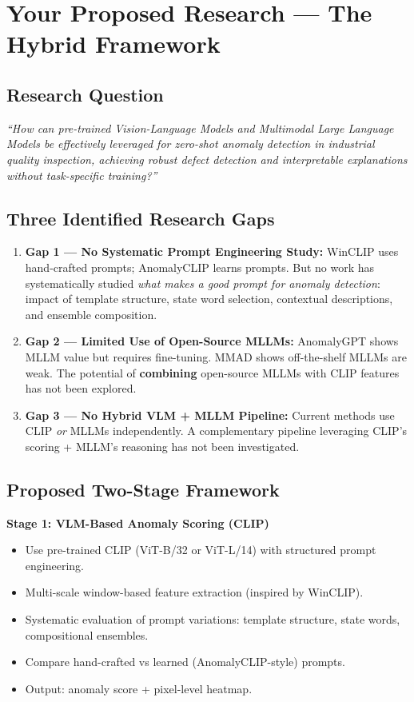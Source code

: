 \documentclass[12pt, a4paper]{article}
\begin{document}
\section{Your Proposed Research --- The Hybrid Framework}

\subsection{Research Question}
\textit{``How can pre-trained Vision-Language Models and Multimodal Large Language Models be effectively leveraged for zero-shot anomaly detection in industrial quality inspection, achieving robust defect detection and interpretable explanations without task-specific training?''}

\subsection{Three Identified Research Gaps}

\begin{enumerate}[leftmargin=*]
    \item \textbf{Gap 1 --- No Systematic Prompt Engineering Study:} WinCLIP uses hand-crafted prompts; AnomalyCLIP learns prompts. But no work has systematically studied \textit{what makes a good prompt for anomaly detection}: impact of template structure, state word selection, contextual descriptions, and ensemble composition.

    \item \textbf{Gap 2 --- Limited Use of Open-Source MLLMs:} AnomalyGPT shows MLLM value but requires fine-tuning. MMAD shows off-the-shelf MLLMs are weak. The potential of \textbf{combining} open-source MLLMs with CLIP features has not been explored.

    \item \textbf{Gap 3 --- No Hybrid VLM + MLLM Pipeline:} Current methods use CLIP \textit{or} MLLMs independently. A complementary pipeline leveraging CLIP's scoring + MLLM's reasoning has not been investigated.
\end{enumerate}

\subsection{Proposed Two-Stage Framework}

\textbf{Stage 1: VLM-Based Anomaly Scoring (CLIP)}
\begin{itemize}[leftmargin=*]
    \item Use pre-trained CLIP (ViT-B/32 or ViT-L/14) with structured prompt engineering.
    \item Multi-scale window-based feature extraction (inspired by WinCLIP).
    \item Systematic evaluation of prompt variations: template structure, state words, compositional ensembles.
    \item Compare hand-crafted vs learned (AnomalyCLIP-style) prompts.
    \item Output: anomaly score + pixel-level heatmap.
\end{itemize}
\end{document}
